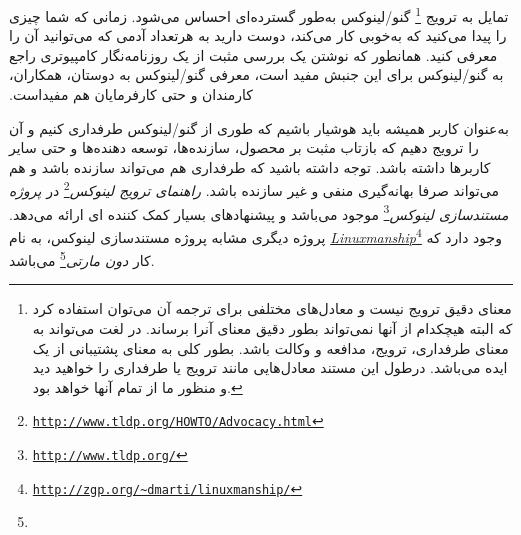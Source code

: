 تمایل به ترویج 
\footnote{
معنای دقیق  ترویج نیست و
معادل‌های مختلفی برای ترجمه آن می‌توان استفاده کرد که البته
هیچکدام از آنها نمی‌تواند بطور دقیق معنای آنرا برساند. 
در لغت می‌تواند به معنای طرفداری، ترویج، مدافعه و وکالت باشد.
بطور کلی  به معنای پشتیبانی از یک ایده می‌باشد.
درطول این مستند معادل‌هایی مانند ترویج یا طرفداری را خواهید دید
و منظور ما از تمام آنها  خواهد بود.
}
گنو/لینوکس به‌طور گسترده‌ای احساس می‌شود.
زمانی که شما چیزی را پیدا می‌کنید که ‫به‌خوبی کار می‌کند،
دوست دارید به هرتعداد آدمی که می‌توانید آن را معرفی کنید.
همانطور که نوشتن یک بررسی مثبت از یک روزنامه‌نگار کامپیوتری
راجع به گنو/لینوکس برای این جنبش مفید است، معرفی گنو/لینوکس
به دوستان، همکاران، کارمندان و حتی کارفرمایان هم مفیداست.

به‌عنوان کاربر همیشه باید هوشیار باشیم که طوری از گنو/لینوکس
طرفداری کنیم و آن را ترویج دهیم که بازتاب مثبت بر محصول،
سازنده‌ها، توسعه دهنده‌ها و حتی سایر کاربرها داشته باشد.
توجه داشته باشید که طرفداری هم می‌تواند سازنده باشد و هم می‌تواند
صرفا بهانه‌گیری منفی و غیر سازنده باشد.
\emph{راهنمای ترویج لینوکس}\footnote{\texttt{\url{http://www.tldp.org/HOWTO/Advocacy.html}}}
در
\emph{پروژه مستندسازی لینوکس}\footnote{\texttt{\url{http://www.tldp.org/}}}
موجود می‌باشد و پیشنهادهای بسیار کمک کننده ای ارائه می‌دهد.
پروژه دیگری مشابه پروژه مستندسازی لینوکس، به نام 
\emph{\url{Linuxmanship}}\footnote{\texttt{\url{http://zgp.org/~dmarti/linuxmanship/}}}
وجود دارد که کار
\emph{دون مارتی}\footnote{}
می‌باشد.



